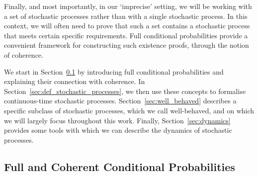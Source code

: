 \documentclass[10pt,a4paper]{paper}
\theoremstyle{definition}
\begin{document}
Finally, and most importantly, in our `imprecise' setting, we will be working with a set of stochastic processes rather than with a single stochastic process. In this context, we will often need to prove that such a set contains a stochastic process that meets certain specific requirements.
Full conditional probabilities provide a convenient framework for constructing such existence proofs, through the notion of coherence.

We start in Section~\ref{sec:cond_prob} by introducing full conditional probabilities and explaining their connection with coherence. In Section~\ref{sec:def_stochastic_processes}, we then use these concepts to formalise continuous-time stochastic processes. Section~\ref{sec:well_behaved} describes a specific subclass of stochastic processes, which we call well-behaved, and on which we will largely focus throughout this work. Finally, Section~\ref{sec:dynamics} provides some tools with which we can describe the dynamics of stochastic processes.

\subsection{Full and Coherent Conditional Probabilities}\label{sec:cond_prob}

\end{document}
